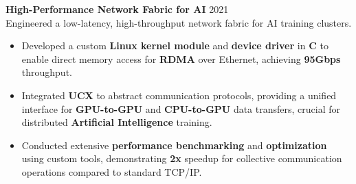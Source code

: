 \documentclass[11pt,a4paper]{article}
\begin{document}
\textbf{High-Performance Network Fabric for AI} \hfill 2021 \\
Engineered a low-latency, high-throughput network fabric for AI training clusters.
\begin{itemize}
    \item Developed a custom \textbf{Linux kernel module} and \textbf{device driver} in \textbf{C} to enable direct memory access for \textbf{RDMA} over Ethernet, achieving \textbf{95Gbps} throughput.
    \item Integrated \textbf{UCX} to abstract communication protocols, providing a unified interface for \textbf{GPU-to-GPU} and \textbf{CPU-to-GPU} data transfers, crucial for distributed \textbf{Artificial Intelligence} training.
    \item Conducted extensive \textbf{performance benchmarking} and \textbf{optimization} using custom tools, demonstrating \textbf{2x} speedup for collective communication operations compared to standard TCP/IP.
\end{itemize}

\end{document}
